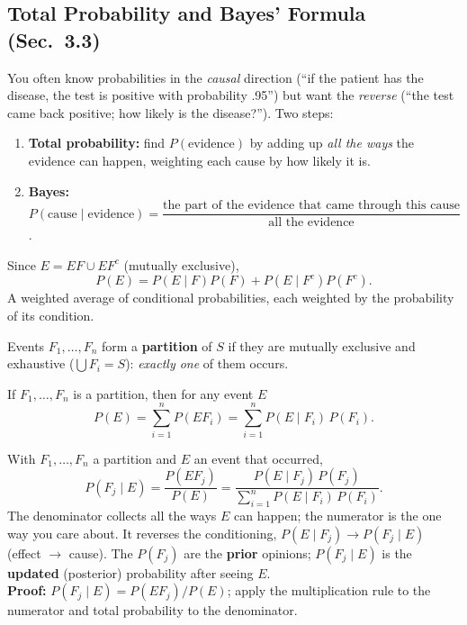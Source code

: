 \documentclass[11pt]{article}
\let\oldsubsection\subsection
\renewcommand{\subsection}{\Needspace{14\baselineskip}\oldsubsection}
\begin{document}
\subsection{Total Probability and Bayes' Formula (Sec.\ 3.3)}

\begin{ideabox}
You often know probabilities in the \emph{causal} direction (``if the patient has the disease, the test is positive with probability .95'') but want the \emph{reverse} (``the test came back positive; how likely is the disease?''). Two steps:
\begin{enumerate}
\item \textbf{Total probability:} find $P(\text{evidence})$ by adding up \emph{all the ways} the evidence can happen, weighting each cause by how likely it is.
\item \textbf{Bayes:} $P(\text{cause}\mid\text{evidence})=\dfrac{\text{the part of the evidence that came through this cause}}{\text{all the evidence}}$.
\end{enumerate}
\end{ideabox}

\begin{thmbox}
Since $E=EF\cup EF^c$ (mutually exclusive),
\[ P(E)=P(E\mid F)P(F)+P(E\mid F^c)P(F^c). \]
A weighted average of conditional probabilities, each weighted by the probability of its condition.
\end{thmbox}

\begin{defbox}[Partition]
Events $F_1,\dots,F_n$ form a \textbf{partition} of $S$ if they are mutually exclusive and exhaustive ($\bigcup F_i=S$): \emph{exactly one} of them occurs.
\end{defbox}

\begin{thmbox}
If $F_1,\dots,F_n$ is a partition, then for any event $E$
\[ P(E)=\sum_{i=1}^nP(EF_i)=\sum_{i=1}^nP(E\mid F_i)\,P(F_i). \]
\end{thmbox}

\begin{thmbox}
With $F_1,\dots,F_n$ a partition and $E$ an event that occurred,
\[ P(F_j\mid E)=\frac{P(EF_j)}{P(E)}=\frac{P(E\mid F_j)\,P(F_j)}{\displaystyle\sum_{i=1}^nP(E\mid F_i)\,P(F_i)}. \]
The denominator collects all the ways $E$ can happen; the numerator is the one way you care about. It reverses the conditioning, $P(E\mid F_j)\to P(F_j\mid E)$ (effect $\to$ cause). The $P(F_j)$ are the \textbf{prior} opinions; $P(F_j\mid E)$ is the \textbf{updated} (posterior) probability after seeing $E$.\\
\textbf{Proof:} $P(F_j\mid E)=P(EF_j)/P(E)$; apply the multiplication rule to the numerator and total probability to the denominator.
\end{thmbox}
\end{document}

